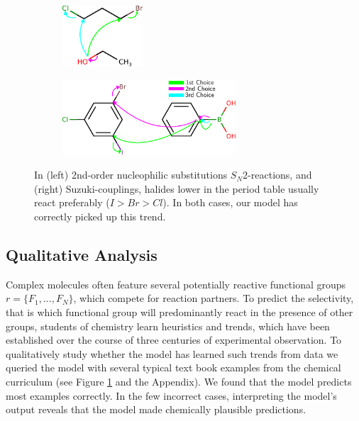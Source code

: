 
\begin{figure}[t]

    \centering
    \begin{subfigure}[b]{0.3\textwidth}
        \centering
        \includegraphics[height=0.9in]{imgs/textbook/reaction3}\\\vspace{0.1in}
    \end{subfigure}%
    \hspace{1cm}
     \begin{subfigure}[b]{0.5\textwidth}
        \centering
        \includegraphics[height=1.1in]{imgs/textbook/reaction7}
    \end{subfigure}
	\caption{In (left) 2nd-order nucleophilic substitutions $S_N 2$-reactions, and (right) Suzuki-couplings, halides lower in the period table usually react preferably ($I>Br>Cl$). In both cases, our model has correctly picked up this trend.}
	\label{fig:qualitative}
\vspace{-0.5em}
\end{figure}



\subsection{Qualitative Analysis}

Complex molecules often feature several potentially reactive functional groups $r=\{F_1,...,F_N\}$, which compete for reaction partners. 
To predict the selectivity, that is which functional group will predominantly react in the presence of other groups, 
students of chemistry learn heuristics and trends, 
which have been established over the course of three centuries of experimental observation.
To qualitatively study whether the model has learned such trends from data we queried the model with several typical text book examples from the chemical curriculum (see Figure \ref{fig:qualitative} and the Appendix). 
We found that the model predicts most examples correctly. In the few incorrect cases, interpreting the model's output reveals that the model made chemically plausible predictions.

